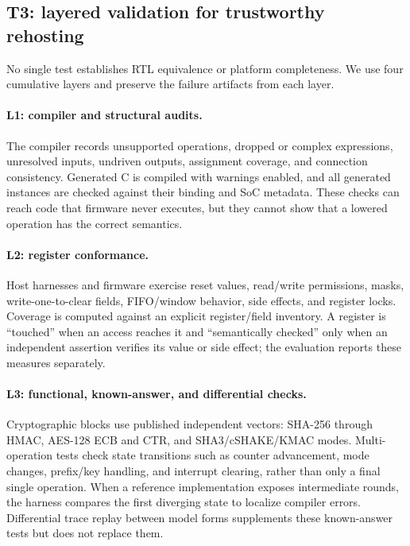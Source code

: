 \subsection{T3: layered validation for trustworthy rehosting}

No single test establishes RTL equivalence or platform completeness.  We use
four cumulative layers and preserve the failure artifacts from each layer.

\paragraph{L1: compiler and structural audits.}
The compiler records unsupported operations, dropped or complex expressions,
unresolved inputs, undriven outputs, assignment coverage, and connection
consistency.  Generated C is compiled with warnings enabled, and all generated
instances are checked against their binding and SoC metadata.  These checks can
reach code that firmware never executes, but they cannot show that a lowered
operation has the correct semantics.

\paragraph{L2: register conformance.}
Host harnesses and firmware exercise reset values, read/write permissions,
masks, write-one-to-clear fields, FIFO/window behavior, side effects, and
register locks.  Coverage is computed against an explicit register/field
inventory.  A register is ``touched'' when an access reaches it and
``semantically checked'' only when an independent assertion verifies its value
or side effect; the evaluation reports these measures separately.

\paragraph{L3: functional, known-answer, and differential checks.}
Cryptographic blocks use published independent vectors: SHA-256 through HMAC,
AES-128 ECB and CTR, and SHA3/cSHAKE/KMAC modes.  Multi-operation tests check
state transitions such as counter advancement, mode changes, prefix/key
handling, and interrupt clearing, rather than only a final single operation.
When a reference implementation exposes intermediate rounds, the harness
compares the first diverging state to localize compiler errors.  Differential
trace replay between model forms supplements these known-answer tests but does
not replace them.

